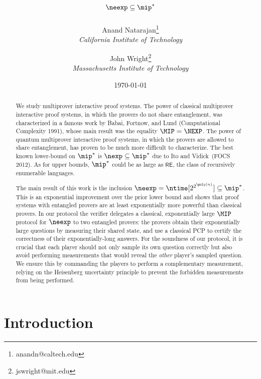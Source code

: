 

\title{$\neexp \subseteq \mip^*$\vspace*{10pt}}

\author{Anand Natarajan\thanks{anandn@caltech.edu}\\
 \small{\sl California Institute of Technology} \and John Wright\thanks{jswright@mit.edu}\\ \small{\sl Massachusetts Institute of Technology}\vspace*{10pt}
}

\date{\today}

\maketitle


\begin{abstract}
We study multiprover interactive proof systems.
The power of classical multiprover interactive proof systems,
in which the provers do not share entanglement,
was characterized in a famous work by Babai, Fortnow, and Lund
(Computational Complexity 1991),
whose main result was the equality $\MIP = \NEXP$.
The power of quantum multiprover interactive proof systems,
in which the provers are allowed to share entanglement,
has proven to be much more difficult to characterize.
The best known lower-bound on $\mip^*$ is $\nexp \subseteq \mip^*$ due
to Ito and Vidick~(FOCS 2012).
As for upper bounds, $\mip^*$ could be as large as $\mathsf{RE}$, the class of recursively enumerable languages.

The main result of this work is the inclusion $\neexp = \ntime[2^{2^{\poly(n)}}] \subseteq \mip^*$.
This is an exponential improvement over the prior lower bound
and shows that proof systems with entangled provers are at least exponentially more
powerful than classical provers. In our protocol the verifier
delegates a classical, exponentially large $\MIP$ protocol for
$\neexp$ to two entangled provers: the provers obtain their
exponentially large questions by measuring their shared state, and use
a classical PCP to certify the correctness of their exponentially-long
answers. For the soundness of our protocol, it is
crucial that each player should not only sample its own question correctly
but also avoid performing measurements that would reveal the
\emph{other} player's sampled question. We ensure this by commanding
the players to perform a complementary measurement, relying on the Heisenberg uncertainty
principle to prevent the forbidden measurements from being performed.



\end{abstract}


\newpage

\tableofcontents
\vfill
\thispagestyle{empty}
\newpage


\part{Introduction}


